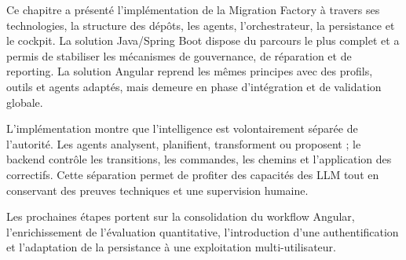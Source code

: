 Ce chapitre a présenté l'implémentation de la Migration Factory à travers ses technologies, la structure des dépôts, les agents, l'orchestrateur, la persistance et le cockpit. La solution Java/Spring Boot dispose du parcours le plus complet et a permis de stabiliser les mécanismes de gouvernance, de réparation et de reporting. La solution Angular reprend les mêmes principes avec des profils, outils et agents adaptés, mais demeure en phase d'intégration et de validation globale.

L'implémentation montre que l'intelligence est volontairement séparée de l'autorité. Les agents analysent, planifient, transforment ou proposent ; le backend contrôle les transitions, les commandes, les chemins et l'application des correctifs. Cette séparation permet de profiter des capacités des LLM tout en conservant des preuves techniques et une supervision humaine.

Les prochaines étapes portent sur la consolidation du workflow Angular, l'enrichissement de l'évaluation quantitative, l'introduction d'une authentification et l'adaptation de la persistance à une exploitation multi-utilisateur.
